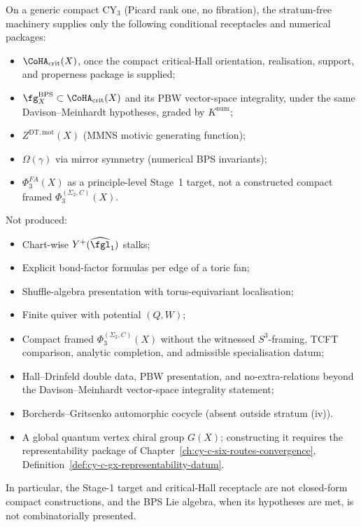 \begin{theorem}
\label{thm:recovery-summary}
On a generic compact CY$_3$ (Picard rank one, no fibration), the
stratum-free machinery supplies only the following conditional
receptacles and numerical packages:
\begin{itemize}[leftmargin=2em]
\item $\CoHA_{\mathrm{crit}}(X)$, once the compact critical-Hall
 orientation, realisation, support, and properness package is supplied;
\item $\fg_X^{\mathrm{BPS}} \subset \CoHA_{\mathrm{crit}}(X)$ and its
 PBW vector-space integrality, under the same Davison--Meinhardt
 hypotheses, graded by $K^{\mathrm{num}}$;
\item $Z^{\mathrm{DT,mot}}(X)$ (MMNS motivic generating function);
\item $\Omega(\gamma)$ via mirror symmetry (numerical BPS invariants);
\item $\Phi^{FA}_3(X)$ as a principle-level Stage~1 target, not a
 constructed compact framed $\Phi_3^{(\Sigma_2,C)}(X)$.
\end{itemize}
Not produced:
\begin{itemize}[leftmargin=2em]
\item Chart-wise $Y^+(\widehat{\fgl}_1)$ stalks;
\item Explicit bond-factor formulas per edge of a toric fan;
\item Shuffle-algebra presentation with torus-equivariant localisation;
\item Finite quiver with potential $(Q, W)$;
\item Compact framed $\Phi_3^{(\Sigma_2,C)}(X)$ without the witnessed
 $S^3$-framing, TCFT comparison, analytic completion, and admissible
 specialisation datum;
\item Hall--Drinfeld double data, PBW presentation, and
 no-extra-relations beyond the Davison--Meinhardt vector-space
 integrality statement;
\item Borcherds--Gritsenko automorphic cocycle (absent outside stratum
 (iv)).
\item A global quantum vertex chiral group $G(X)$; constructing it
 requires the representability package of
 Chapter~\ref{ch:cy-c-six-routes-convergence},
 Definition~\ref{def:cy-c-gx-representability-datum}.
\end{itemize}
In particular, the Stage-1 target and critical-Hall receptacle are not
closed-form compact constructions, and the BPS Lie algebra, when its
hypotheses are met, is not combinatorially presented.
\end{theorem}

